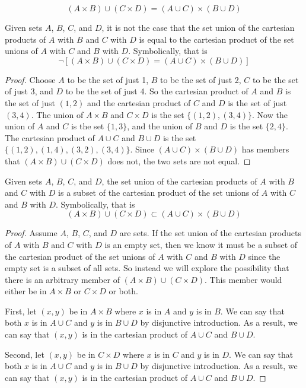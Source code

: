\documentclass[main.tex]{subfiles}
\begin{document}
\subproblem{}\label{2m}
\[(A \times B) \cup (C \times D) = (A \cup C) \times (B \cup D)\]
\begin{thm}
	Given sets \(A\), \(B\), \(C\), and \(D\), it is not the case that the
	set union of the cartesian products of \(A\) with \(B\) and \(C\) with
	\(D\) is equal to the cartesian product of the set unions of \(A\) with
	\(C\) and \(B\) with \(D\). Symbolically, that is
	\[\neg [(A \times B) \cup (C \times D) = (A \cup C) \times (B \cup D)]\]
\end{thm}
\begin{proof}
	Choose \(A\) to be the set of just 1, \(B\) to be the set of just 2,
	\(C\) to be the set of just 3, and \(D\) to be the set of just 4. So the
	cartesian product of \(A\) and \(B\) is the set of just \((1, 2)\) and
	the cartesian product of \(C\) and \(D\) is the set of just \((3, 4)\).
	The union of \(A \times B\) and \(C \times D\) is the set
	\(\{(1, 2), (3, 4)\}\). Now the union of \(A\) and \(C\) is the set
	\(\{1, 3\}\), and the union of \(B\) and \(D\) is the set \(\{2, 4\}\).
	The cartesian product of \(A \cup C\) and \(B \cup D\) is the set
	\(\{(1, 2), (1, 4), (3, 2), (3, 4)\}\). Since
	\((A \cup C) \times (B \cup D)\) has members that
	\((A \times B) \cup (C \times D)\) does not, the two sets are not equal.
\end{proof}

\begin{thm}
	Given sets \(A\), \(B\), \(C\), and \(D\), the set union of the
	cartesian products of \(A\) with \(B\) and \(C\) with \(D\) is a subset
	of the cartesian product of the set unions of \(A\) with \(C\) and \(B\)
	with \(D\). Symbolically, that is
	\[(A \times B) \cup (C \times D) \subset (A \cup C) \times (B \cup D)\]
\end{thm}
\begin{proof}
	Assume \(A\), \(B\), \(C\), and \(D\) are sets. If the set union of the
	cartesian products of \(A\) with \(B\) and \(C\) with \(D\) is an empty
	set, then we know it must be a subset of the cartesian product of the
	set unions of \(A\) with \(C\) and \(B\) with \(D\) since the empty set
	is a subset of all sets. So instead we will explore the possibility that
	there is an arbitrary member of \((A \times B) \cup (C \times D)\). This
	member would either be in \(A \times B\) or \(C \times D\) or both.

	First, let \((x, y)\) be in \(A \times B\) where \(x\) is in \(A\) and
	\(y\) is in \(B\). We can say that both \(x\) is in \(A \cup C\) and
	\(y\) is in \(B \cup D\) by disjunctive introduction. As a result, we
	can say that \((x, y)\) is in the cartesian product of \(A \cup C\) and
	\(B \cup D\).

	Second, let \((x, y)\) be in \(C \times D\) where \(x\) is in \(C\) and
	\(y\) is in \(D\). We can say that both \(x\) is in \(A \cup C\) and
	\(y\) is in \(B \cup D\) by disjunctive introduction. As a result, we
	can say that \((x, y)\) is in the cartesian product of \(A \cup C\) and
	\(B \cup D\).
\end{proof}
\end{document}
